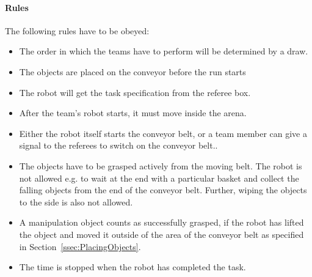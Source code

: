 \paragraph{Rules}
The following rules have to be obeyed:

\begin{itemize}
\item The order in which the teams have to perform will be determined by a draw.
\item The objects are placed on the conveyor before the run starts
\item The robot will get the task specification from the referee box.
\item After the team's robot starts, it must move inside the arena.
\item Either the robot itself starts the conveyor belt, or a team member can give a signal to the referees to switch on the conveyor belt..
\item The objects have to be grasped actively from the moving belt. The robot is not allowed e.g. to wait at the end with a particular basket and collect the falling objects from the end of the conveyor belt. Further, wiping the objects to the side is also not allowed.
\item A manipulation object counts as successfully grasped, if the robot has lifted the object and moved it outside of the area of the conveyor belt as specified in Section~\ref{ssec:PlacingObjects}.
\item The time is stopped when the robot has completed the task.
\end{itemize}



%
%
